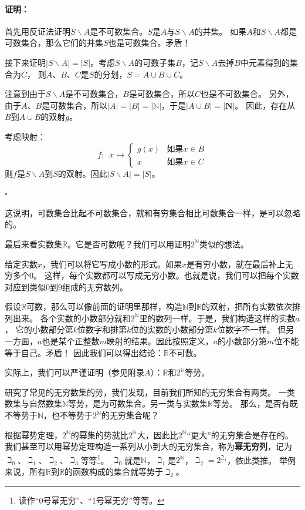 \documentclass[12pt,UTF8]{ctexbook}
\theoremstyle{definition}
\theoremstyle{plain}
\renewenvironment{proof}{\paragraph{\textbf{证明：}}}{\hfill$\square$}
\begin{document}
\begin{proof}
    首先用反证法证明$S\backslash A$是不可数集合。$S$是$A$与$S\backslash A$的并集。
    如果$A$和$S\backslash A$都是可数集合，那么它们的并集$S$也是可数集合。矛盾！

    接下来证明$|S\backslash A| = |S|$。考虑$S\backslash A$的可数子集$B$，记$S\backslash A$去掉$B$中元素得到的集合为$C$，
    则$A$、$B$、$C$是$S$的分划，$S = A\cup B\cup C$。
    
    注意到由于$S\backslash A$是不可数集合，$B$是可数集合，所以$C$也是不可数集合。
    另外，由于$A$、$B$是可数集合，所以$ |A| = |B| = |\mathbb{N}|$，于是$|A\cup B| = |\mathbf{N}|$。
    因此，存在从$B$到$A\cup B$的双射$g$。

    考虑映射：
    $$ f:\,\,\,x\mapsto \left\{
        \begin{array}{cl}
            g(x) & \mbox{如果}x\in B \\
            x & \mbox{如果}x \in C
        \end{array}\right.
    $$
    则$f$是$S\backslash A$到$S$的双射。因此$|S\backslash A| = |S|$。
    
\end{proof}

这说明，可数集合比起不可数集合，就和有穷集合相比可数集合一样，是可以忽略的。

最后来看实数集$\mathbb{R}$。它是否可数呢？我们可以用证明$2^\mathbb{N}$类似的想法。

给定实数$x$，我们可以将它写成小数的形式。如果$x$是有穷小数，就在最后补上无穷多个$0$。
这样，每个实数都可以写成无穷小数。也就是说，我们可以把每个实数对应到类似$0$到$9$组成的无穷数列。

假设$\mathbb{R}$可数，那么可以像前面的证明里那样，构造$\mathbb{N}$到$\mathbb{R}$的双射，把所有实数依次排列出来。
各个实数的小数部分就和$2^\mathbb{N}$里的数列一样。于是，我们构造这样的实数$a$，
它的小数部分第$k$位数字和排第$k$位的实数的小数部分第$k$位数字不一样。
但另一方面，$a$也是某个正整数$m$映射的结果。因此按照定义，$a$的小数部分第$m$位不能等于自己。矛盾！
因此我们可以得出结论：$\mathbb{R}$不可数。

实际上，我们可以严谨证明（参见附录$A$）：$\mathbb{R}$和$2^\mathbb{N}$等势。

研究了常见的无穷数集的势，我们发现，目前我们所知的无穷集合有两类。
一类数集与自然数集$\mathbb{N}$等势，是为可数集合。另一类与实数集$\mathbb{R}$等势。
那么，是否有既不等势于$\mathbb{N}$，也不等势于$2^\mathbb{N}$的无穷集合呢？

根据幂势定理，$2^\mathbb{N}$的幂集的势就比$2^\mathbb{N}$大，因此比$2^\mathbb{N}$“更大”的无穷集合是存在的。
我们甚至可以用幂势定理构造一系列从小到大的无穷集合，称为\textbf{幂无穷列}，记为$\beth_0$、$\beth_1$、$\beth_2$、$\beth_3$等等\footnote{读作“$0$号幂无穷”、“$1$号幂无穷”等等。}。
$\beth_0$就是$\mathbb{N}$，$\beth_1$是$2^\mathbb{N}$，$\beth_2 = 2^{\beth_1}$，依此类推。
举例来说，所有$\mathbb{R}$到$\mathbb{R}$的函数构成的集合就等势于$\beth_2$。
\end{document}
